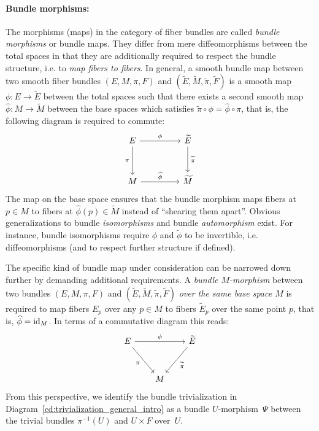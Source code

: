 \paragraph{Bundle morphisms:}

The morphisms (maps) in the category of fiber bundles are called \emph{bundle morphisms} or bundle maps.
They differ from mere diffeomorphisms between the total spaces in that they are additionally required to respect the bundle structure, i.e. to \emph{map fibers to fibers}.
In general, a smooth bundle map between two smooth fiber bundles $(E,M,\pi,F)$ and $(\widetilde{E},\widetilde{M},\widetilde{\pi},\widetilde{F})$ is a smooth map $\phi: E \to \widetilde{E}$ between the total spaces such that there exists a second smooth map $\widehat{\phi}: M \to \widetilde{M}$ between the base spaces which satisfies $\widetilde{\pi} \circ \phi = \widehat{\phi} \circ \pi$, that is, the following diagram is required to commute:
\begin{equation}\label{cd:general_bundle_morphism}
\begin{tikzcd}[row sep=3.em, column sep=4.5em]
    E
            \arrow[r, "\phi"]
            \arrow[d, "\pi\,"']
    & \widetilde{E}
            \arrow[d, "\,\widetilde{\pi}"]
    \\
    M
            \arrow[r, "\widehat{\phi}"]
    & \widetilde{M}
\end{tikzcd}
\end{equation}
The map on the base space ensures that the bundle morphism maps fibers at $p\in M$ to fibers at $\widehat{\phi}(p) \in \widetilde{M}$ instead of ``shearing them apart''.
Obvious generalizations to bundle \emph{isomorphisms} and bundle \emph{automorphism} exist.
For instance, bundle isomorphisms require $\phi$ and $\widetilde{\phi}$ to be invertible, i.e. diffeomorphisms (and to respect further structure if defined).


The specific kind of bundle map under consideration can be narrowed down further by demanding additional requirements.
A \emph{bundle $M$-morphism} between two bundles $(E,M,\pi,F)$ and $(\widetilde{E},\widetilde{M},\widetilde{\pi},\widetilde{F})$ \emph{over the same base space $M$} is required to map fibers $E_p$ over any $p \in M$ to fibers $\widetilde{E}_p$ over the same point $p$, that is, $\widehat{\phi} = \mathrm{id}_M$.
In terms of a commutative diagram this reads:
\begin{equation}\label{cd:bundle_M_morphism}
\begin{tikzcd}[row sep=3.em, column sep=2em]
    E
            \arrow[rr, "\phi"]
            \arrow[dr, "\pi\,"']
    & & \widetilde{E}
            \arrow[dl, "\,\widetilde{\pi}"]
    \\
    & M
\end{tikzcd}
\end{equation}
From this perspective, we identify the bundle trivialization in Diagram~\eqref{cd:trivialization_general_intro} as a bundle $U$-morphism~$\Psi$ between the trivial bundles $\pi^{-1}(U)$ and $U\times F$ over~$U$.

